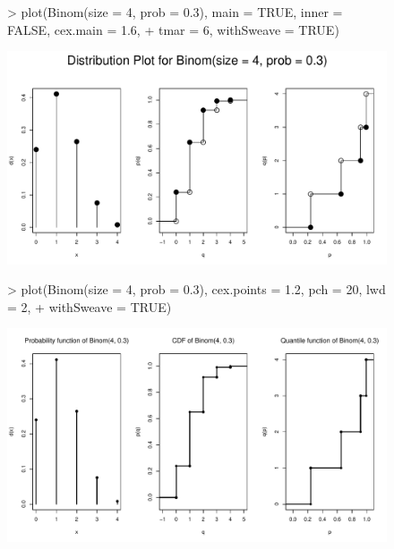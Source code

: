 \documentclass[11pt]{article}
\begin{document}
\begin{figure}[p]
\begin{Schunk}
\begin{Sinput}
> plot(Binom(size = 4, prob = 0.3), main = TRUE, inner = FALSE, cex.main = 1.6,
+      tmar = 6, withSweave = TRUE)
\end{Sinput}
\end{Schunk}
\includegraphics{distr-plotex3}
\end{figure}

\begin{figure}[p]
\begin{Schunk}
\begin{Sinput}
> plot(Binom(size = 4, prob = 0.3), cex.points = 1.2, pch = 20, lwd = 2,
+      withSweave = TRUE)
\end{Sinput}
\end{Schunk}
\includegraphics{distr-plotex4}
\end{figure}
\end{document}
